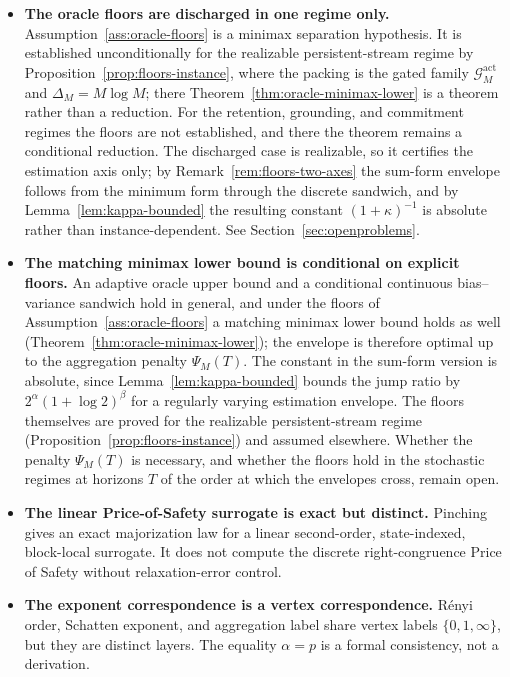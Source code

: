 \documentclass[12pt]{article}
\theoremstyle{definition}
\newcommand{\PsiAgg}{\Psi}
\newcommand{\Gact}{\mathcal G^{\mathrm{act}}}
\begin{document}
\begin{itemize}[leftmargin=1.8em]
\item \textbf{The oracle floors are discharged in one regime only.}
Assumption~\ref{ass:oracle-floors} is a minimax separation hypothesis.  It is
established unconditionally for the realizable persistent-stream regime by
Proposition~\ref{prop:floors-instance}, where the packing is the gated family
$\Gact_M$ and $\Delta_M=M\log M$; there
Theorem~\ref{thm:oracle-minimax-lower} is a theorem rather than a reduction.
For the retention, grounding, and commitment regimes the floors are not
established, and there the theorem remains a conditional reduction.  The
discharged case is realizable, so it certifies the estimation axis only; by
Remark~\ref{rem:floors-two-axes} the sum-form envelope follows from the minimum
form through the discrete sandwich, and by Lemma~\ref{lem:kappa-bounded} the
resulting constant $(1+\kappa)^{-1}$ is absolute rather than
instance-dependent.  See Section~\ref{sec:openproblems}.

\item \textbf{The matching minimax lower bound is conditional on explicit
floors.}
An adaptive oracle upper bound and a conditional continuous bias--variance
sandwich hold in general, and under the floors of
Assumption~\ref{ass:oracle-floors} a matching minimax lower bound holds as well
(Theorem~\ref{thm:oracle-minimax-lower}); the envelope is therefore optimal up
to the aggregation penalty $\PsiAgg_M(T)$.  The constant in the sum-form
version is absolute, since Lemma~\ref{lem:kappa-bounded} bounds the jump ratio
by $2^\alpha(1+\log2)^\beta$ for a regularly varying estimation envelope.  The
floors themselves are proved for the realizable persistent-stream regime
(Proposition~\ref{prop:floors-instance}) and assumed elsewhere.  Whether the
penalty $\PsiAgg_M(T)$ is necessary, and whether the floors hold in the
stochastic regimes at horizons $T$ of the order at which the envelopes cross,
remain open.

\item \textbf{The linear Price-of-Safety surrogate is exact but distinct.}
Pinching gives an exact majorization law for a linear second-order,
state-indexed, block-local surrogate.  It does not compute the discrete
right-congruence Price of Safety without relaxation-error control.

\item \textbf{The exponent correspondence is a vertex correspondence.}
R\'enyi order, Schatten exponent, and aggregation label share vertex labels
$\{0,1,\infty\}$, but they are distinct layers.  The equality $\alpha=p$ is
a formal consistency, not a derivation.


\end{itemize}
\end{document}
